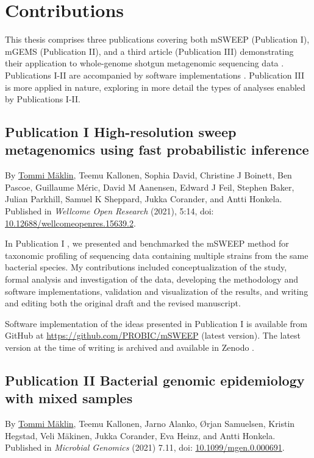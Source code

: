 \documentclass[officiallayout]{tktla}
\begin{document}
\section{Contributions}

This thesis comprises three publications covering both mSWEEP
\citep{maklin_high-resolution_2021} (Publication I), mGEMS
\citep{maklin_bacterial_2021} (Publication II), and a third article
(Publication III) demonstrating their application to whole-genome
shotgun metagenomic sequencing data
\citep{maklin_strong_2022}. Publications I-II are accompanied by
software implementations \citep{maklin_mSWEEP,
  maklin_mGEMS}. Publication III is more applied in nature, exploring
in more detail the types of analyses enabled by Publications I-II.

\subsection*{Publication I \textemdash{ } High-resolution sweep metagenomics using fast probabilistic inference}
By \underline{Tommi M\"aklin}, Teemu Kallonen, Sophia David, Christine J
Boinett, Ben Pascoe, Guillaume M\'eric, David M Aanensen, Edward J Feil,
Stephen Baker, Julian Parkhill, Samuel K Sheppard, Jukka Corander, and
Antti Honkela. Published in \textit{Wellcome Open Research} (2021),
5:14, doi: \href{https://doi.org/10.12688/wellcomeopenres.15639.2}{10.12688/wellcomeopenres.15639.2}.

In Publication I \citep{maklin_high-resolution_2021}, we presented and
benchmarked the mSWEEP method for taxonomic profiling of sequencing
data containing multiple strains from the same bacterial species. My
contributions included conceptualization of the study, formal analysis
and investigation of the data, developing the methodology and software
implementations, validation and visualization of the results, and
writing and editing both the original draft and the revised
manuscript.

Software implementation of the ideas presented in Publication I is available
from GitHub at
\href{https://github.com/PROBIC/mSWEEP}{https://github.com/PROBIC/mSWEEP}
(latest version). The latest version at the time of writing is
archived and available in Zenodo \citep{maklin_mSWEEP}.

\subsection*{Publication II \textemdash{ } Bacterial genomic epidemiology with mixed samples}
By \underline{Tommi M\"aklin}, Teemu Kallonen, Jarno Alanko, \O rjan
Samuelsen, Kristin Hegstad, Veli M\"akinen, Jukka Corander, Eva Heinz,
and Antti Honkela. Published in \textit{Microbial Genomics} (2021)
7.11, doi: \href{https://doi.org/10.1099/mgen.0.000691}{10.1099/mgen.0.000691}.
\end{document}
